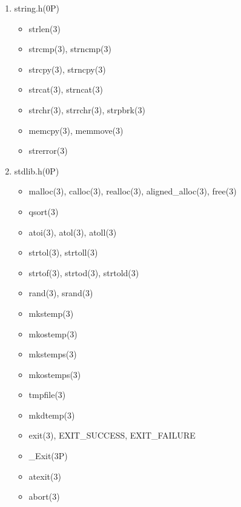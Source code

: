 \documentclass{article}
\begin{document}
\begin{enumerate}
\begin{enumerate}
            \item string.h(0P)
                \begin{itemize}
                    \item strlen(3)
                    \item strcmp(3), strncmp(3)
                    \item strcpy(3), strncpy(3)
                    \item strcat(3), strncat(3)
                    \item strchr(3), strrchr(3), strpbrk(3)
                    \item memcpy(3), memmove(3)

                    \item strerror(3)
                \end{itemize}
            \item stdlib.h(0P)
                \begin{itemize}
                    \item malloc(3), calloc(3), realloc(3), aligned_alloc(3), free(3)

                    \item qsort(3)

                    \item atoi(3), atol(3), atoll(3)
                    \item strtol(3), strtoll(3)
                    \item strtof(3), strtod(3), strtold(3)

                    \item rand(3), srand(3)

                    \item mkstemp(3)
                    \item mkostemp(3)
                    \item mkstemps(3)
                    \item mkostemps(3)
                    \item tmpfile(3)
                    \item mkdtemp(3)

                    \item exit(3), EXIT_SUCCESS, EXIT_FAILURE
                    \item _Exit(3P)
                    \item atexit(3)
                    \item abort(3)


\end{itemize}
\end{enumerate}
\end{enumerate}
\end{document}
